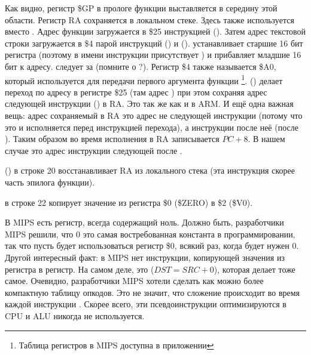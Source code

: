

Как видно, регистр \$GP в прологе функции выставляется в середину этой области.
Регистр \ac{RA} сохраняется в локальном стеке.
Здесь также используется \puts вместо \printf.
Адрес функции \puts загружается в \$25 инструкцией  ().
Затем адрес текстовой строки загружается в \$4 парой инструкций  () и
 ().
 устанавливает старшие 16 бит регистра (поэтому в имени инструкции присутствует ) и 
прибавляет младшие 16 бит к адресу.
 следует за  (помните о ?).
Регистр \$4 также называется \$A0, который используется для передачи первого аргумента функции
\footnote{Таблица регистров в MIPS доступна в приложении }.
 () делает переход по адресу в регистре \$25 (там адрес \puts) 
при этом сохраняя адрес следующей инструкции () в \ac{RA}.
Это так же как и в ARM.
И ещё одна важная вещь: адрес сохраняемый в \ac{RA} это адрес не следующей инструкции (потому что
это  и исполняется перед инструкцией перехода),
а инструкции после неё (после ).
Таким образом во время исполнения  в \ac{RA} записывается $PC + 8$.
В нашем случае это адрес инструкции  следующей после .

 () в строке 20 восстанавливает \ac{RA} из локального стека (эта инструкция скорее часть эпилога функции).

 в строке 22 копирует значение из регистра \$0 (\$ZERO) в \$2 (\$V0).

\label{MIPS_zero_register}
В MIPS есть  регистр, всегда содержащий ноль.
Должно быть, разработчики MIPS решили, что 0 это самая востребованная константа в программировании,
так что пусть будет использоваться регистр \$0, всякий раз, когда будет нужен 0.
Другой интересный факт: в MIPS нет инструкции, копирующей значения из регистра в регистр.
На самом деле,  это  ($DST=SRC+0$), которая делает тоже самое.
Очевидно, разработчики MIPS хотели сделать как можно более компактную таблицу опкодов.
Это не значит, что сложение происходит во время каждой инструкции .
Скорее всего, эти псевдоинструкции оптимизируются в \ac{CPU} и \ac{ALU} никогда не используется.

